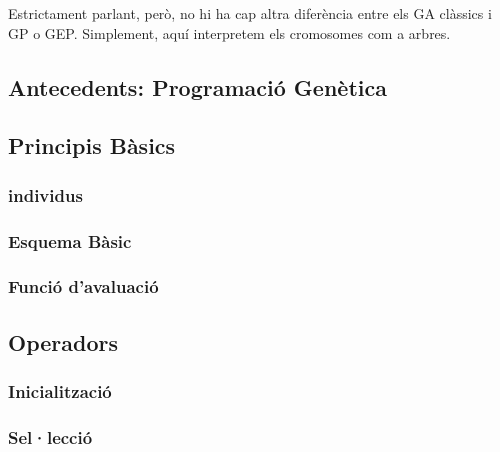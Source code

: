 \documentclass[titlepage,a4paper,12pt]{book}
\begin{document}
Estrictament parlant, però, no hi ha cap altra diferència entre els GA clàssics
i GP o GEP.  Simplement, aquí interpretem els cromosomes com a arbres.

\subsection{Antecedents: Programació Genètica} %
\label{sub:Ant. Programacio Genetica}


\subsection{Principis Bàsics} %
\label{sub:Principis Basics}

\subsubsection{individus} %
\label{ssub:individus}

\subsubsection{Esquema Bàsic} %
\label{ssub:Esquema Basic}

\subsubsection{Funció d'avaluació} %
\label{ssub:funcio d'avaluacio}

\subsection{Operadors} %
\label{sub:Operadors}

\subsubsection{Inicialització} %
\label{ssub:Inicialitzacio}

\subsubsection{Sel·lecció} %
\label{ssub:Seleccio}
\end{document}
